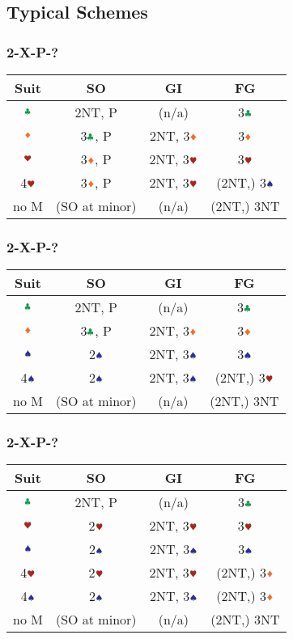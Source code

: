 \documentclass{article}
\begin{document}
\begin{multicols}{2}
\subsection{Typical Schemes}
\subsubsection{2\SSS-X-P-?}
\begin{tabular}{c|c|c|c}
    \hline
    Suit & SO & GI & FG \\ \hline\hline
    $\ccc$ & 2NT, P & (n/a) & 3$\ccc$ \\ \hline
    $\ddd$ & 3$\ccc$, P & 2NT, 3$\ddd$ & 3$\ddd$ \\ \hline
    $\hhh$ & 3$\ddd$, P & 2NT, 3$\hhh$ & 3$\hhh$ \\ \hline
    4$\hhh$ & 3$\ddd$, P & 2NT, 3$\hhh$ & (2NT,) 3$\sss$ \\ \hline
    no M & (SO at minor) & (n/a) & (2NT,) 3NT \\ \hline
\end{tabular}

\subsubsection{2\HHH-X-P-?}
\begin{tabular}{c|c|c|c}
    \hline
    Suit & SO & GI & FG \\ \hline\hline
    $\ccc$ & 2NT, P & (n/a) & 3$\ccc$ \\ \hline
    $\ddd$ & 3$\ccc$, P & 2NT, 3$\ddd$ & 3$\ddd$ \\ \hline
    $\sss$ & 2$\sss$ & 2NT, 3$\sss$ & 3$\sss$ \\ \hline
    4$\sss$ & 2$\sss$ & 2NT, 3$\sss$ & (2NT,) 3$\hhh$ \\ \hline
    no M & (SO at minor) & (n/a) & (2NT,) 3NT \\ \hline
\end{tabular}

\subsubsection{2\DDD-X-P-?}
\begin{tabular}{c|c|c|c}
    \hline
    Suit & SO & GI & FG \\ \hline\hline
    $\ccc$ & 2NT, P & (n/a) & 3$\ccc$ \\ \hline
    $\hhh$ & 2$\hhh$ & 2NT, 3$\hhh$ & 3$\hhh$ \\ \hline
    $\sss$ & 2$\sss$ & 2NT, 3$\sss$ & 3$\sss$ \\ \hline
    4$\hhh$ & 2$\hhh$ & 2NT, 3$\hhh$ & (2NT,) 3$\ddd$ \\ \hline
    4$\sss$ & 2$\sss$ & 2NT, 3$\sss$ & (2NT,) 3$\ddd$ \\ \hline
    no M & (SO at minor) & (n/a) & (2NT,) 3NT \\ \hline
\end{tabular}


\end{multicols}
\end{document}
